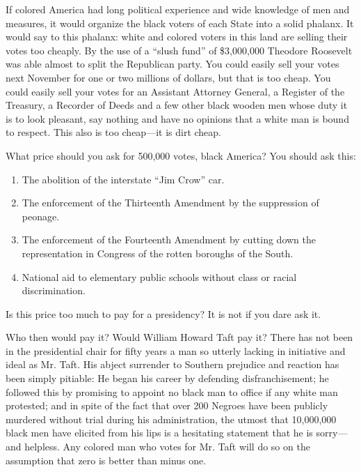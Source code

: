 \documentclass[letterpaper,10pt,english]{jupyterBook}
\begin{document}
\sphinxAtStartPar
If colored America had long political experience and wide knowledge of men and measures, it would organize the black voters of each State into a solid phalanx. It would say to this phalanx: white and colored voters in this land are selling their votes too cheaply. By the use of a “slush fund” of \$3,000,000 Theodore Roosevelt was able almost to split the Republican party. You could easily sell your votes next November for one or two millions of dollars, but that is too cheap. You could easily sell your votes for an Assistant Attorney General, a Register of the Treasury, a Recorder of Deeds and a few other black wooden men whose duty it is to look pleasant, say nothing and have no opinions that a white man is bound to respect. This also is too cheap—it is dirt cheap.

\sphinxAtStartPar
What price should you ask for 500,000 votes, black America? You should ask this:
\begin{enumerate}
%
\item {} 
\sphinxAtStartPar
The abolition of the interstate “Jim Crow” car.

\item {} 
\sphinxAtStartPar
The enforcement of the Thirteenth Amendment by the suppression of peonage.

\item {} 
\sphinxAtStartPar
The enforcement of the Fourteenth Amendment by cutting down the representation in Congress of the rotten boroughs of the South.

\item {} 
\sphinxAtStartPar
National aid to elementary public schools without class or racial discrimination.

\end{enumerate}

\sphinxAtStartPar
Is this price too much to pay for a presidency? It is not if you dare ask it.

\sphinxAtStartPar
Who then would pay it? Would William Howard Taft pay it? There has not been in the presidential chair for fifty years a man so utterly lacking in initiative and ideal as Mr. Taft. His abject surrender to Southern prejudice and reaction has been simply pitiable: He began his career by defending disfranchisement; he followed this by promising to appoint no black man to office if any white man protested; and in spite of the fact that over 200 Negroes have been publicly murdered without trial during his administration, the utmost that 10,000,000 black men have elicited from his lips is a hesitating statement that he is sorry—and helpless. Any colored man who votes for Mr. Taft will do so on the assumption that zero is better than minus one.
\end{document}
